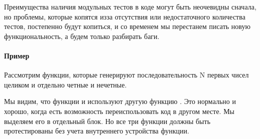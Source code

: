 \documentclass[letterpaper,10pt,russian]{sphinxmanual}
\begin{document}
\sphinxAtStartPar
Преимущества наличия модульных тестов в коде могут быть неочевидны сначала, но проблемы, которые копятся из\sphinxhyphen{}за отсутствия или недостаточного количества тестов, постепенно будут копиться, и со временем мы перестанем писать новую функциональность, а будем только разбирать баги.

\sphinxAtStartPar
{}


\paragraph{Пример}
\label{\detokenize{educational_materials/testing/content:id5}}
\sphinxAtStartPar
Рассмотрим функции, которые генерируют последовательность N первых чисел целиком и отдельно четные и нечетные.

\begin{sphinxVerbatim}[commandchars=\\\{\}]
 
     
    
 
      
      \PYG{p}{[}      \PYG{p}{]}
     

 
      
      \PYG{p}{[}        \PYG{p}{]}
     
\end{sphinxVerbatim}

\sphinxAtStartPar
Мы видим, что функции  и  используют другую функцию . Это нормально и хорошо, когда есть возможность переиспользовать код в другом месте. Мы выделяем его в отдельный блок. Но все три функции должны быть протестированы без учета внутреннего устройства функции.
\end{document}
